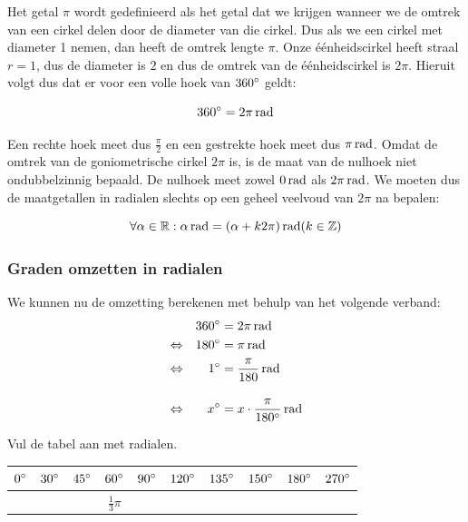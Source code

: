 \documentclass[a4paper,12pt]{article}
\begin{document}
Het getal $\pi$ wordt gedefinieerd als het getal dat we krijgen wanneer we de omtrek van een cirkel delen door de diameter van die cirkel. Dus als we een cirkel met diameter 1 nemen, dan heeft de omtrek lengte $\pi$. Onze éénheidscirkel heeft straal $r=1$, dus de diameter is $2$ en dus de omtrek van de éénheidscirkel is $2\pi$. Hieruit volgt dus dat er voor een volle hoek van $360^\circ$ geldt:
\begin{mdframed}
$$360\degree = 2\pi \rad$$
\end{mdframed}


Een rechte hoek meet dus $\frac{\pi}{2}$ en een gestrekte hoek meet dus $\pi \rad$. Omdat de omtrek van de goniometrische cirkel $2\pi$ is, is de maat van de nulhoek niet ondubbelzinnig bepaald. De nulhoek meet zowel $0 \rad$ als $2\pi \rad$. We moeten dus de maatgetallen in radialen slechts op een geheel veelvoud van $2\pi$ na bepalen:

\begin{mdframed}
$$\forall \alpha \in \mathbb{R} : \alpha \rad = (\alpha + k2\pi) \rad (k\in \mathbb{Z})$$
\end{mdframed}

\subsubsection{Graden omzetten in radialen}
We kunnen nu de omzetting berekenen met behulp van het volgende verband:
\begin{alignat*}{2}
     &&360\degree &= 2\pi \rad\\
\LRA &&180\degree &= \pi \rad\\
\LRA &&  1\degree &= \frac{\pi}{180} \rad\\[1em]
\LRA &&  x\degree &= x\cdot\frac{\pi}{180\degree} \rad
\end{alignat*}

\begin{oefening}
Vul de tabel aan met radialen.
\begin{center}
  \begin{tabular}{c|c|c|c|c|c|c|c|c|c}
    $0^\circ$ & $30^\circ$ & $45^\circ$ & $60^\circ$ &$90^\circ$ &$120^\circ$ &$135^\circ$ &$150^\circ$ &$180^\circ$ & $270^\circ$ \\
    \hline
   &&&$\frac{1}{3}\pi$&&&&&&\\
  \end{tabular}
\end{center}
\end{oefening}
\end{document}

